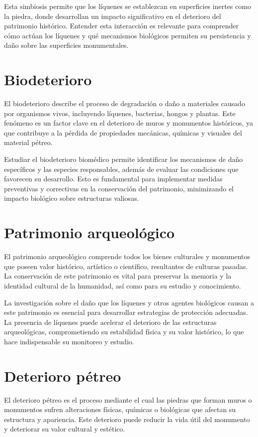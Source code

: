 Esta simbiosis permite que los líquenes se establezcan en superficies inertes como la piedra, donde desarrollan un impacto significativo en el deterioro del patrimonio histórico. Entender esta interacción es relevante para comprender cómo actúan los líquenes y qué mecanismos biológicos permiten su persistencia y daño sobre las superficies monumentales.

\section{Biodeterioro}
El biodeterioro describe el proceso de degradación o daño a materiales causado por organismos vivos, incluyendo líquenes, bacterias, hongos y plantas. Este fenómeno es un factor clave en el deterioro de muros y monumentos históricos, ya que contribuye a la pérdida de propiedades mecánicas, químicas y visuales del material pétreo.

Estudiar el biodeterioro biomédico permite identificar los mecanismos de daño específicos y las especies responsables, además de evaluar las condiciones que favorecen su desarrollo. Esto es fundamental para implementar medidas preventivas y correctivas en la conservación del patrimonio, minimizando el impacto biológico sobre estructuras valiosas.
\section{Patrimonio arqueológico}
El patrimonio arqueológico comprende todos los bienes culturales y monumentos que poseen valor histórico, artístico o científico, resultantes de culturas pasadas. La conservación de este patrimonio es vital para preservar la memoria y la identidad cultural de la humanidad, así como para su estudio y conocimiento.

La investigación sobre el daño que los líquenes y otros agentes biológicos causan a este patrimonio es esencial para desarrollar estrategias de protección adecuadas. La presencia de líquenes puede acelerar el deterioro de las estructuras arqueológicas, comprometiendo su estabilidad física y su valor histórico, lo que hace indispensable su monitoreo y estudio.
\section{Deterioro pétreo}
El deterioro pétreo es el proceso mediante el cual las piedras que forman muros o monumentos sufren alteraciones físicas, químicas o biológicas que afectan su estructura y apariencia. Este deterioro puede reducir la vida útil del monumento y deteriorar su valor cultural y estético.

